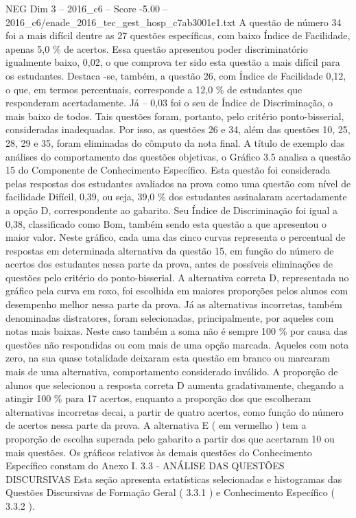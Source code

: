 \begin{textsample}{NEG Dim 3 – 2016\_c6 – Score -5.00 – 2016\_c6/enade\_2016\_tec\_gest\_hosp\_c7ab3001e1.txt}
A questão de número 34 foi a mais difícil dentre as 27 questões específicas, com baixo Índice de Facilidade, apenas 5,0 \% de acertos.
Essa questão apresentou poder discriminatório igualmente baixo, 0,02, o que comprova ter sido esta questão a mais difícil para os estudantes.
Destaca -se, também, a questão 26, com Índice de Facilidade 0,12, o que, em termos percentuais, corresponde a 12,0 \% de estudantes que responderam acertadamente.
Já – 0,03 foi o seu de Índice de Discriminação, o mais baixo de todos.
Tais questões foram, portanto, pelo critério ponto-bisserial, consideradas inadequadas.
Por isso, as questões 26 e 34, além das questões 10, 25, 28, 29 e 35, foram eliminadas do cômputo da nota final.
A título de exemplo das análises do comportamento das questões objetivas, o Gráfico 3.5 analisa a questão 15 do Componente de Conhecimento Específico.
Esta questão foi considerada pelas respostas dos estudantes avaliados na prova como uma questão com nível de facilidade Difícil, 0,39, ou seja, 39,0 \% dos estudantes assinalaram acertadamente a opção D, correspondente ao gabarito.
Seu Índice de Discriminação foi igual a 0,38, classificado como Bom, também sendo esta questão a que apresentou o maior valor.
Neste gráfico, cada uma das cinco curvas representa o percentual de respostas em determinada alternativa da questão 15, em função do número de acertos dos estudantes nessa parte da prova, antes de possíveis eliminações de questões pelo critério do ponto-bisserial.
A alternativa correta D, representada no gráfico pela curva em roxo, foi escolhida em maiores proporções pelos alunos com desempenho melhor nessa parte da prova.
Já as alternativas incorretas, também denominadas distratores, foram selecionadas, principalmente, por aqueles com notas mais baixas.
Neste caso também a soma não é sempre 100 \% por causa das questões não respondidas ou com mais de uma opção marcada.
Aqueles com nota zero, na sua quase totalidade deixaram esta questão em branco ou marcaram mais de uma alternativa, comportamento considerado inválido.
A proporção de alunos que selecionou a resposta correta D aumenta gradativamente, chegando a atingir 100 \% para 17 acertos, enquanto a proporção dos que escolheram alternativas incorretas decai, a partir de quatro acertos, como função do número de acertos nessa parte da prova.
A alternativa E ( em vermelho ) tem a proporção de escolha superada pelo gabarito a partir dos que acertaram 10 ou mais questões.
Os gráficos relativos às demais questões do Conhecimento Específico constam do Anexo I. 3.3 - ANÁLISE DAS QUESTÕES DISCURSIVAS Esta seção apresenta estatísticas selecionadas e histogramas das Questões Discursivas de Formação Geral ( 3.3.1 ) e Conhecimento Específico ( 3.3.2 ).

\end{textsample}
